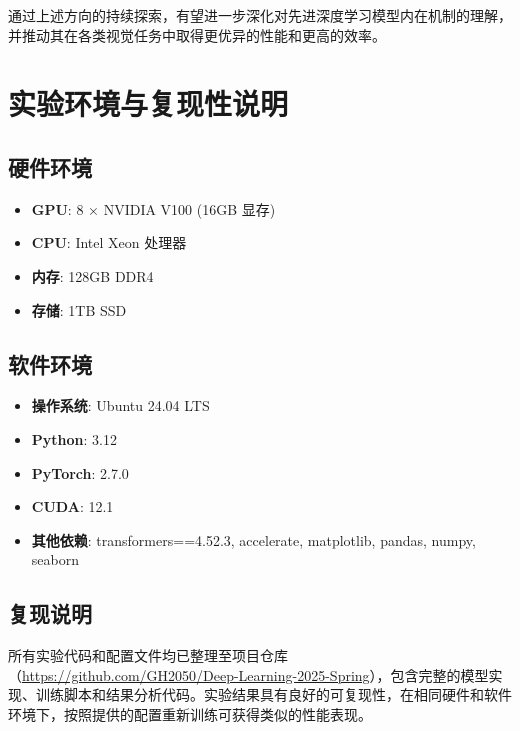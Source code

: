 \documentclass[a4paper]{article}
\begin{document}
通过上述方向的持续探索，有望进一步深化对先进深度学习模型内在机制的理解，并推动其在各类视觉任务中取得更优异的性能和更高的效率。




\appendix

\section{实验环境与复现性说明}
\label{app:reproducibility}

\subsection{硬件环境}
\begin{itemize}
    \item \textbf{GPU}: 8 × NVIDIA V100 (16GB 显存)
    \item \textbf{CPU}: Intel Xeon 处理器
    \item \textbf{内存}: 128GB DDR4
    \item \textbf{存储}: 1TB SSD
\end{itemize}

\subsection{软件环境}
\begin{itemize}
    \item \textbf{操作系统}: Ubuntu 24.04 LTS
    \item \textbf{Python}: 3.12
    \item \textbf{PyTorch}: 2.7.0
    \item \textbf{CUDA}: 12.1
    \item \textbf{其他依赖}: transformers==4.52.3, accelerate, matplotlib, pandas, numpy, seaborn
\end{itemize}

\subsection{复现说明}
所有实验代码和配置文件均已整理至项目仓库（\url{https://github.com/GH2050/Deep-Learning-2025-Spring}），包含完整的模型实现、训练脚本和结果分析代码。实验结果具有良好的可复现性，在相同硬件和软件环境下，按照提供的配置重新训练可获得类似的性能表现。
\end{document}
